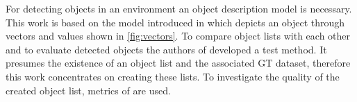 
For detecting objects in an environment an object description model is necessary. This work is based on the model introduced in \cite{Aeberhard} which depicts an object through vectors and values shown in \cref{fig:vectors}.
To compare object lists with each other and to evaluate detected objects the authors of \cite{Reway} developed a test method. It presumes the existence of an object list and the associated GT dataset, therefore this work concentrates on creating these lists. To investigate the quality of the created object list, metrics of \cite{Reway} are used.
